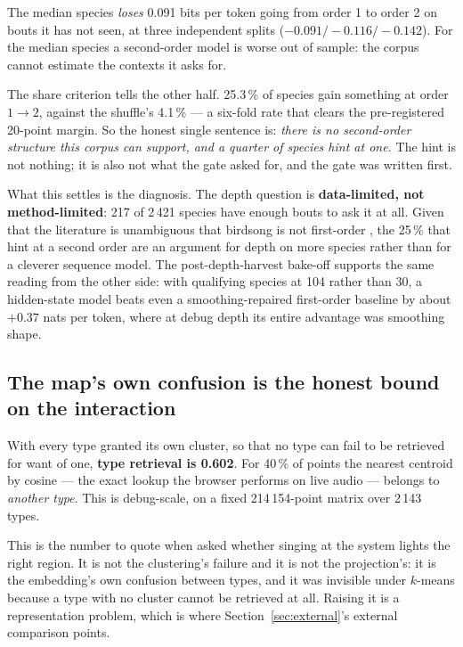 \documentclass[10pt,twocolumn,a4paper]{article}
\begin{document}
The median species \emph{loses} 0.091 bits per token going from order 1 to order 2 on bouts
it has not seen, at three independent splits ($-0.091 / -0.116 / -0.142$). For the median
species a second-order model is worse out of sample: the corpus cannot estimate the contexts
it asks for.

The share criterion tells the other half. 25.3\,\% of species gain something at order
$1 \to 2$, against the shuffle's 4.1\,\% --- a six-fold rate that clears the pre-registered
20-point margin. So the honest single sentence is: \emph{there is no second-order structure
this corpus can support, and a quarter of species hint at one.} The hint is not nothing; it
is also not what the gate asked for, and the gate was written first.

What this settles is the diagnosis. The depth question is \textbf{data-limited, not
method-limited}: 217 of 2\,421 species have enough bouts to ask it at all. Given that the
literature is unambiguous that birdsong is not first-order \citep{jin2011,lu2025}, the 25\,\%
that hint at a second order are an argument for depth on more species rather than for a
cleverer sequence model. The post-depth-harvest bake-off supports the same reading from the
other side: with qualifying species at 104 rather than 30, a hidden-state model beats even a
smoothing-repaired first-order baseline by about $+0.37$ nats per token, where at debug depth
its entire advantage was smoothing shape.

\subsection{The map's own confusion is the honest bound on the interaction}

With every type granted its own cluster, so that no type can fail to be retrieved for want
of one, \textbf{type retrieval is 0.602}. For 40\,\% of points the nearest centroid by cosine
--- the exact lookup the browser performs on live audio --- belongs to \emph{another type}.
This is debug-scale, on a fixed 214\,154-point matrix over 2\,143 types.

This is the number to quote when asked whether singing at the system lights the right region.
It is not the clustering's failure and it is not the projection's: it is the embedding's own
confusion between types, and it was invisible under $k$-means because a type with no cluster
cannot be retrieved at all. Raising it is a representation problem, which is where
Section~\ref{sec:external}'s external comparison points.
\end{document}
